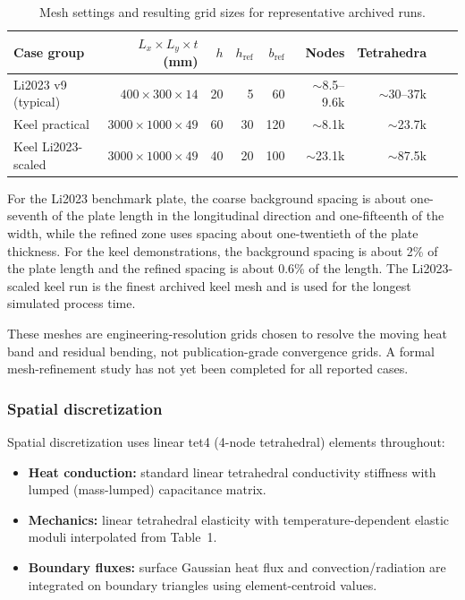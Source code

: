   \begin{table}[H]
  \centering
  \caption{Mesh settings and resulting grid sizes for representative archived runs.}
  \label{tab:mesh-settings}
  \small
  \begin{tabular}{lrrrrrrrr}
  \toprule
  Case group & $L_x\times L_y\times t$ (mm) & $h$ & $h_{\mathrm{ref}}$ & $b_{\mathrm{ref}}$ & Nodes & Tetrahedra \\
  \midrule
  Li2023 v9 (typical) & $400\times300\times14$ & 20 & 5 & 60 & $\sim$8.5--9.6k & $\sim$30--37k \\
  Keel practical & $3000\times1000\times49$ & 60 & 30 & 120 & $\sim$8.1k & $\sim$23.7k \\
  Keel Li2023-scaled & $3000\times1000\times49$ & 40 & 20 & 100 & $\sim$23.1k & $\sim$87.5k \\
  \bottomrule
  \end{tabular}
  \end{table}

  For the Li2023 benchmark plate, the coarse background spacing is about one-seventh of the plate length in the longitudinal direction and one-fifteenth of the width, while the refined zone uses spacing about one-twentieth of the plate thickness. For the keel demonstrations, the background spacing is about 2\% of the plate length and the refined spacing is about 0.6\% of the length. The Li2023-scaled keel run is the finest archived keel mesh and is used for the longest simulated process time.

  These meshes are engineering-resolution grids chosen to resolve the moving heat band and residual bending, not publication-grade convergence grids. A formal mesh-refinement study has not yet been completed for all reported cases.

  \subsubsection{Spatial discretization}
  Spatial discretization uses linear tet4 (4-node tetrahedral) elements throughout:
  \begin{itemize}
    \item \textbf{Heat conduction:} standard linear tetrahedral conductivity stiffness with lumped (mass-lumped) capacitance matrix.
    \item \textbf{Mechanics:} linear tetrahedral elasticity with temperature-dependent elastic moduli interpolated from Table~1.
    \item \textbf{Boundary fluxes:} surface Gaussian heat flux and convection/radiation are integrated on boundary triangles using element-centroid values.
  \end{itemize}

